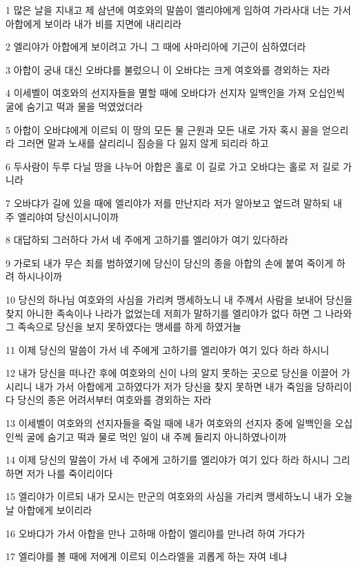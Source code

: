\par 1 많은 날을 지내고 제 삼년에 여호와의 말씀이 엘리야에게 임하여 가라사대 너는 가서 아합에게 보이라 내가 비를 지면에 내리리라
\par 2 엘리야가 아합에게 보이려고 가니 그 때에 사마리아에 기근이 심하였더라
\par 3 아합이 궁내 대신 오바댜를 불렀으니 이 오바댜는 크게 여호와를 경외하는 자라
\par 4 이세벨이 여호와의 선지자들을 멸할 때에 오바댜가 선지자 일백인을 가져 오십인씩 굴에 숨기고 떡과 물을 먹였었더라
\par 5 아합이 오바댜에게 이르되 이 땅의 모든 물 근원과 모든 내로 가자 혹시 꼴을 얻으리라 그러면 말과 노새를 살리리니 짐승을 다 잃지 않게 되리라 하고
\par 6 두사람이 두루 다닐 땅을 나누어 아합은 홀로 이 길로 가고 오바댜는 홀로 저 길로 가니라
\par 7 오바댜가 길에 있을 때에 엘리야가 저를 만난지라 저가 알아보고 엎드려 말하되 내 주 엘리야여 당신이시니이까
\par 8 대답하되 그러하다 가서 네 주에게 고하기를 엘리야가 여기 있다하라
\par 9 가로되 내가 무슨 죄를 범하였기에 당신이 당신의 종을 아합의 손에 붙여 죽이게 하려 하시나이까
\par 10 당신의 하나님 여호와의 사심을 가리켜 맹세하노니 내 주께서 사람을 보내어 당신을 찾지 아니한 족속이나 나라가 없었는데 저희가 말하기를 엘리야가 없다 하면 그 나라와 그 족속으로 당신을 보지 못하였다는 맹세를 하게 하였거늘
\par 11 이제 당신의 말씀이 가서 네 주에게 고하기를 엘리야가 여기 있다 하라 하시니
\par 12 내가 당신을 떠나간 후에 여호와의 신이 나의 알지 못하는 곳으로 당신을 이끌어 가시리니 내가 가서 아합에게 고하였다가 저가 당신을 찾지 못하면 내가 죽임을 당하리이다 당신의 종은 어려서부터 여호와를 경외하는 자라
\par 13 이세벨이 여호와의 선지자들을 죽일 때에 내가 여호와의 선지자 중에 일백인을 오십인씩 굴에 숨기고 떡과 물로 먹인 일이 내 주께 들리지 아니하였나이까
\par 14 이제 당신의 말씀이 가서 네 주에게 고하기를 엘리야가 여기 있다 하라 하시니 그리하면 저가 나를 죽이리이다
\par 15 엘리야가 이르되 내가 모시는 만군의 여호와의 사심을 가리켜 맹세하노니 내가 오늘날 아합에게 보이리라
\par 16 오바댜가 가서 아합을 만나 고하매 아합이 엘리야를 만나려 하여 가다가
\par 17 엘리야를 볼 때에 저에게 이르되 이스라엘을 괴롭게 하는 자여 네냐
